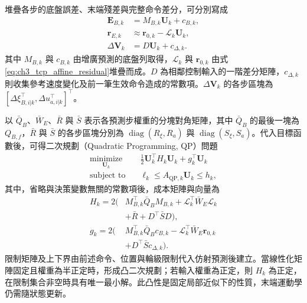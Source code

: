 堆疊各步的底盤誤差、末端殘差與完整命令差分，可分別寫成
\begin{equation}
    \begin{aligned}
        \mathbf{E}_{B,k}
        &=M_{B,k}\mathbf{U}_k+c_{B,k}, \\
        \mathbf{r}_{E,k}
        &\approx\mathbf{r}_{0,k}-\mathcal{L}_k\mathbf{U}_k, \\
        \Delta\mathbf{V}_k
        &=D\mathbf{U}_k+c_{\Delta,k}.
    \end{aligned}
    \label{eq:ch3_stacked_objective_maps}
\end{equation}
其中 $M_{B,k}$ 與 $c_{B,k}$ 由增廣預測的底盤列取得，$\mathcal{L}_k$ 與 $\mathbf{r}_{0,k}$ 由式\eqref{eq:ch3_tcp_affine_residual}堆疊而成。$D$ 為相鄰控制輸入的一階差分矩陣，$c_{\Delta,k}$ 則收集參考速度變化及前一筆生效命令造成的常數項。$\Delta\mathbf{V}_k$ 的各步區塊為 $[\Delta\xi_{B,i|k}^{\top},\Delta u_{a,i|k}^{\top}]^{\top}$。

以 $\bar{Q}_B$、$\bar{W}_E$、$\bar{R}$ 與 $\bar{S}$ 表示各預測步權重的分塊對角矩陣，其中 $\bar{Q}_B$ 的最後一塊為 $Q_{B,f}$，$\bar{R}$ 與 $\bar{S}$ 的各步區塊分別為 $\operatorname{diag}(R_{\xi},R_a)$ 與 $\operatorname{diag}(S_{\xi},S_a)$。代入目標函數後，可得二次規劃（Quadratic Programming, QP）問題
\begin{equation}
    \begin{aligned}
        \underset{\mathbf{U}_k}{\operatorname{minimize}}\quad
        &\frac{1}{2}\mathbf{U}_k^{\top}H_k\mathbf{U}_k
          +g_k^{\top}\mathbf{U}_k \\
        \operatorname{subject\ to}\quad
        &\ell_k\leq A_{\mathrm{QP},k}\mathbf{U}_k\leq h_k,
    \end{aligned}
    \label{eq:ch3_wholebody_qp}
\end{equation}
其中，省略與決策變數無關的常數項後，成本矩陣與向量為
\begin{equation}
    \begin{aligned}
        H_k=2\big(&M_{B,k}^{\top}\bar{Q}_B M_{B,k}
             +\mathcal{L}_k^{\top}\bar{W}_E\mathcal{L}_k \\
             &+\bar{R}+D^{\top}\bar{S}D\big), \\
        g_k=2\big(&M_{B,k}^{\top}\bar{Q}_B c_{B,k}
             -\mathcal{L}_k^{\top}\bar{W}_E\mathbf{r}_{0,k} \\
             &+D^{\top}\bar{S}c_{\Delta,k}\big).
    \end{aligned}
    \label{eq:ch3_wholebody_qp_cost_matrices}
\end{equation}
限制矩陣及上下界由前述命令、位置與輪級限制代入仿射預測後建立。當線性化矩陣固定且權重為半正定時，形成凸二次規劃；若輸入權重為正定，則 $H_k$ 為正定，在限制集合非空時具有唯一最小解。此凸性是固定局部近似下的性質，末端運動學仍需隨狀態更新。

